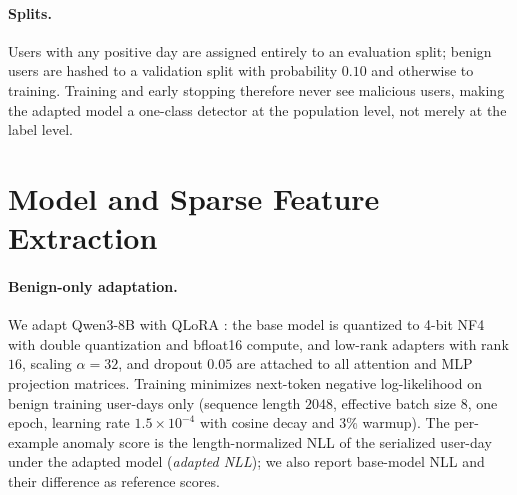 \documentclass[10pt]{article} %
\begin{document}
\paragraph{Splits.}
Users with any positive day are assigned entirely to an evaluation split;
benign users are hashed to a validation split with probability $0.10$ and
otherwise to training. Training and early stopping therefore never see
malicious users, making the adapted model a one-class detector at the
population level, not merely at the label level.

\section{Model and Sparse Feature Extraction}
\label{sec:model}

\paragraph{Benign-only adaptation.}
We adapt Qwen3-8B \citep{qwen3} with QLoRA \citep{dettmers2023qlora}: the base
model is quantized to 4-bit NF4 with double quantization and bfloat16 compute,
and low-rank adapters \citep{hu2022lora} with rank $16$, scaling $\alpha=32$,
and dropout $0.05$ are attached to all attention and MLP projection matrices.
Training minimizes next-token negative log-likelihood on benign training
user-days only (sequence length $2048$, effective batch size $8$, one epoch,
learning rate $1.5\times10^{-4}$ with cosine decay and $3\%$ warmup). The
per-example anomaly score is the length-normalized NLL of the serialized
user-day under the adapted model (\emph{adapted NLL}); we also report base-model
NLL and their difference as reference scores.
\end{document}
